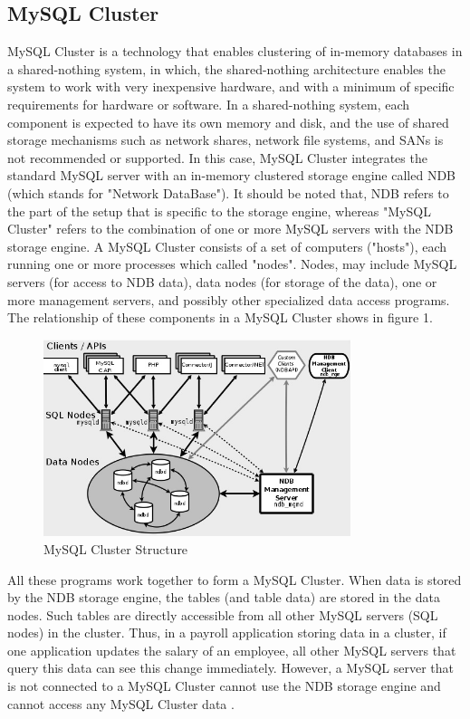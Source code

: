 \documentclass[10pt, conference]{IEEEtran}
\begin{document}
\subsection{MySQL Cluster}
\indent MySQL Cluster is a technology that enables clustering of in-memory databases in a shared-nothing system, in which, the shared-nothing architecture enables the system to work with very inexpensive hardware, and with a minimum of specific requirements for hardware or software. In a shared-nothing system, each component is expected to have its own memory and disk, and the use of shared storage mechanisms such as network shares, network file systems, and SANs is not recommended or supported. In this case, MySQL Cluster integrates the standard MySQL server with an in-memory clustered storage engine called NDB (which stands for "Network DataBase"). It should be noted that, NDB refers to the part of the setup that is specific to the storage engine, whereas "MySQL Cluster" refers to the combination of one or more MySQL servers with the NDB storage engine. A MySQL Cluster consists of a set of computers ("hosts"), each running one or more processes which called "nodes". Nodes, may include MySQL servers (for access to NDB data), data nodes (for storage of the data), one or more management servers, and possibly other specialized data access programs. The relationship of these components in a MySQL Cluster shows in figure 1. 

\begin{figure}[h!]
	\centering
	\includegraphics[width=9cm]{figure1.jpg}
	\caption{MySQL Cluster Structure \cite{ref1}}
\end{figure} 
\indent All these programs work together to form a MySQL Cluster. When data is stored by the NDB storage engine, the tables (and table data) are stored in the data nodes. Such tables are directly accessible from all other MySQL servers (SQL nodes) in the cluster. Thus, in a payroll application storing data in a cluster, if one application updates the salary of an employee, all other MySQL servers that query this data can see this change immediately. However, a MySQL server that is not connected to a MySQL Cluster cannot use the NDB storage engine and cannot access any MySQL Cluster data \cite{ref1}.
\end{document}
